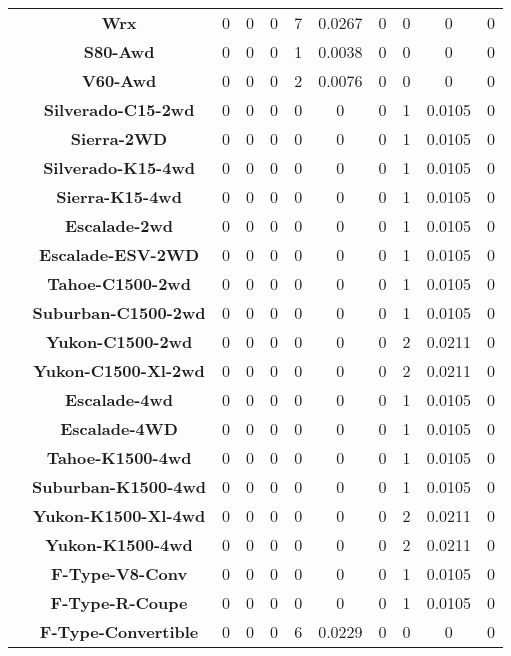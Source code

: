 \begin{center}
\begin{tabular}{|c|c||@{\hspace{1ex}}||c|c|c||@{\hspace{1ex}}||c|c|c||@{\hspace{1ex}}||c|c|c||@{\hspace{1ex}}||}
\cline{2-11}
  & {\bf Wrx} & 0 & 0 & 0 & 7 & 0.0267 & 0 & 0 & 0 & 0 \\
\cline{2-11}
  & {\bf S80-Awd} & 0 & 0 & 0 & 1 & 0.0038 & 0 & 0 & 0 & 0 \\
\cline{2-11}
  & {\bf V60-Awd} & 0 & 0 & 0 & 2 & 0.0076 & 0 & 0 & 0 & 0 \\
\cline{2-11}
  & {\bf Silverado-C15-2wd} & 0 & 0 & 0 & 0 & 0 & 0 & 1 & 0.0105 & 0 \\
\cline{2-11}
  & {\bf Sierra-2WD} & 0 & 0 & 0 & 0 & 0 & 0 & 1 & 0.0105 & 0 \\
\cline{2-11}
  & {\bf Silverado-K15-4wd} & 0 & 0 & 0 & 0 & 0 & 0 & 1 & 0.0105 & 0 \\
\cline{2-11}
  & {\bf Sierra-K15-4wd} & 0 & 0 & 0 & 0 & 0 & 0 & 1 & 0.0105 & 0 \\
\cline{2-11}
  & {\bf Escalade-2wd} & 0 & 0 & 0 & 0 & 0 & 0 & 1 & 0.0105 & 0 \\
\cline{2-11}
  & {\bf Escalade-ESV-2WD} & 0 & 0 & 0 & 0 & 0 & 0 & 1 & 0.0105 & 0 \\
\cline{2-11}
  & {\bf Tahoe-C1500-2wd} & 0 & 0 & 0 & 0 & 0 & 0 & 1 & 0.0105 & 0 \\
\cline{2-11}
  & {\bf Suburban-C1500-2wd} & 0 & 0 & 0 & 0 & 0 & 0 & 1 & 0.0105 & 0 \\
\cline{2-11}
  & {\bf Yukon-C1500-2wd} & 0 & 0 & 0 & 0 & 0 & 0 & 2 & 0.0211 & 0 \\
\cline{2-11}
  & {\bf Yukon-C1500-Xl-2wd} & 0 & 0 & 0 & 0 & 0 & 0 & 2 & 0.0211 & 0 \\
\cline{2-11}
  & {\bf Escalade-4wd} & 0 & 0 & 0 & 0 & 0 & 0 & 1 & 0.0105 & 0 \\
\cline{2-11}
  & {\bf Escalade-4WD} & 0 & 0 & 0 & 0 & 0 & 0 & 1 & 0.0105 & 0 \\
\cline{2-11}
  & {\bf Tahoe-K1500-4wd} & 0 & 0 & 0 & 0 & 0 & 0 & 1 & 0.0105 & 0 \\
\cline{2-11}
  & {\bf Suburban-K1500-4wd} & 0 & 0 & 0 & 0 & 0 & 0 & 1 & 0.0105 & 0 \\
\cline{2-11}
  & {\bf Yukon-K1500-Xl-4wd} & 0 & 0 & 0 & 0 & 0 & 0 & 2 & 0.0211 & 0 \\
\cline{2-11}
  & {\bf Yukon-K1500-4wd} & 0 & 0 & 0 & 0 & 0 & 0 & 2 & 0.0211 & 0 \\
\cline{2-11}
  & {\bf F-Type-V8-Conv} & 0 & 0 & 0 & 0 & 0 & 0 & 1 & 0.0105 & 0 \\
\cline{2-11}
  & {\bf F-Type-R-Coupe} & 0 & 0 & 0 & 0 & 0 & 0 & 1 & 0.0105 & 0 \\
\cline{2-11}
  & {\bf F-Type-Convertible} & 0 & 0 & 0 & 6 & 0.0229 & 0 & 0 & 0 & 0 \\

\end{tabular}
\end{center}
